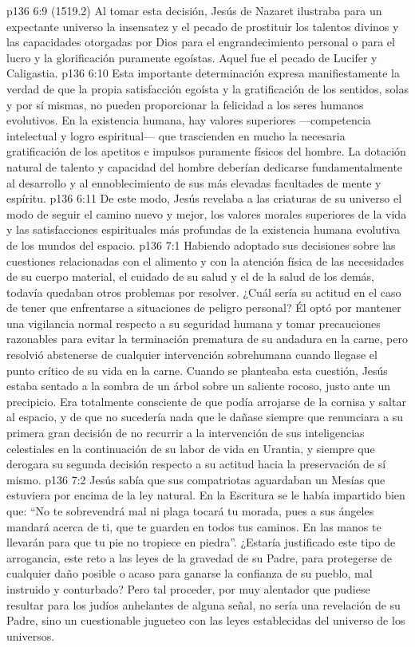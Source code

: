 \vs p136 6:9 \pc (1519.2) Al tomar esta decisión, Jesús de Nazaret ilustraba para un expectante universo la insensatez y el pecado de prostituir los talentos divinos y las capacidades otorgadas por Dios para el engrandecimiento personal o para el lucro y la glorificación puramente egoístas. Aquel fue el pecado de Lucifer y Caligastia.
\vs p136 6:10 Esta importante determinación expresa manifiestamente la verdad de que la propia satisfacción egoísta y la gratificación de los sentidos, solas y por sí mismas, no pueden proporcionar la felicidad a los seres humanos evolutivos. En la existencia humana, hay valores superiores ---competencia intelectual y logro espiritual--- que trascienden en mucho la necesaria gratificación de los apetitos e impulsos puramente físicos del hombre. La dotación natural de talento y capacidad del hombre deberían dedicarse fundamentalmente al desarrollo y al ennoblecimiento de sus más elevadas facultades de mente y espíritu.
\vs p136 6:11 De este modo, Jesús revelaba a las criaturas de su universo el modo de seguir el camino nuevo y mejor, los valores morales superiores de la vida y las satisfacciones espirituales más profundas de la existencia humana evolutiva de los mundos del espacio.
\vs p136 7:1 Habiendo adoptado sus decisiones sobre las cuestiones relacionadas con el alimento y con la atención física de las necesidades de su cuerpo material, el cuidado de su salud y el de la salud de los demás, todavía quedaban otros problemas por resolver. ¿Cuál sería su actitud en el caso de tener que enfrentarse a situaciones de peligro personal? Él optó por mantener una vigilancia normal respecto a su seguridad humana y tomar precauciones razonables para evitar la terminación prematura de su andadura en la carne, pero resolvió abstenerse de cualquier intervención sobrehumana cuando llegase el punto crítico de su vida en la carne. Cuando se planteaba esta cuestión, Jesús estaba sentado a la sombra de un árbol sobre un saliente rocoso, justo ante un precipicio. Era totalmente consciente de que podía arrojarse de la cornisa y saltar al espacio, y de que no sucedería nada que le dañase siempre que renunciara a su primera gran decisión de no recurrir a la intervención de sus inteligencias celestiales en la continuación de su labor de vida en Urantia, y siempre que derogara su segunda decisión respecto a su actitud hacia la preservación de sí mismo.
\vs p136 7:2 Jesús sabía que sus compatriotas aguardaban un Mesías que estuviera por encima de la ley natural. En la Escritura se le había impartido bien que: “No te sobrevendrá mal ni plaga tocará tu morada, pues a sus ángeles mandará acerca de ti, que te guarden en todos tus caminos. En las manos te llevarán para que tu pie no tropiece en piedra”. ¿Estaría justificado este tipo de arrogancia, este reto a las leyes de la gravedad de su Padre, para protegerse de cualquier daño posible o acaso para ganarse la confianza de su pueblo, mal instruido y conturbado? Pero tal proceder, por muy alentador que pudiese resultar para los judíos anhelantes de alguna señal, no sería una revelación de su Padre, sino un cuestionable jugueteo con las leyes establecidas del universo de los universos.
